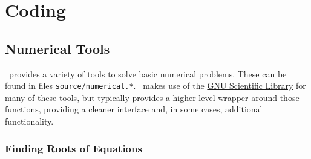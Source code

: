 \chapter{Coding \glc}

\section{Numerical Tools}

\glc\ provides a variety of tools to solve basic numerical problems. These can be found in files {\tt source/numerical.*}. \glc\ makes use of the \href{http://www.gnu.org/software/gsl/}{GNU Scientific Library} for many of these tools, but typically provides a higher-level wrapper around those functions, providing a cleaner interface and, in some cases, additional functionality.

\subsection{Finding Roots of Equations}

